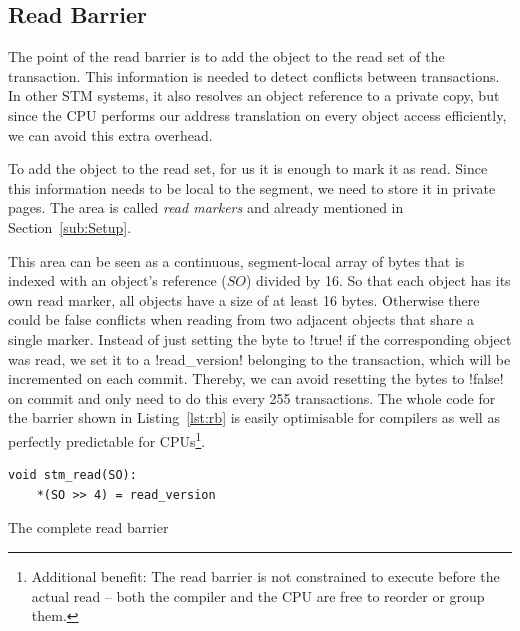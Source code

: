 \documentclass{sigplanconf}
\makeatletter
\renewcommand\lstinline[1][]{%
  \Collectverb{\@@myverb}%
}
\def\@@myverb#1{%
    \begingroup
    \fboxsep=0.2em
    \colorbox{verylightgray}{\oldlstinline|#1|}%
    \endgroup
}
\makeatother
\begin{document}
\subsection{Read Barrier}

The point of the read barrier is to add the object to the read set of
the transaction. This information is needed to detect conflicts
between transactions. In other STM systems, it also resolves an object reference to
a private copy, but since the CPU performs our address translation on
every object access efficiently, we can avoid this extra overhead.

To add the object to the read set, for us it is enough to mark it as
read. Since this information needs to be local to the segment, we need
to store it in private pages. The area is called \emph{read markers}
and already mentioned in Section~\ref{sub:Setup}.

This area can be seen as a continuous, segment-local array of bytes
that is indexed with an object's reference ($SO$) divided by 16. So
that each object has its own read marker, all objects have a size of
at least 16 bytes. Otherwise there could be false conflicts when
reading from two adjacent objects that share a single marker.
Instead of just setting the byte to \lstinline!true!  if the
corresponding object was read, we set it to a \lstinline!read_version!
belonging to the transaction, which will be incremented on each
commit.  Thereby, we can avoid resetting the bytes to
\lstinline!false!  on commit and only need to do this every 255
transactions. The whole code for the barrier shown in
Listing~\ref{lst:rb} is easily optimisable for compilers as well as
perfectly predictable for CPUs\footnote{Additional benefit: The read
barrier is not constrained to execute before the actual read -- both
the compiler and the CPU are free to reorder or group them.}.

\begin{code}[h]
\begin{lstlisting}
void stm_read(SO):
    *(SO >> 4) = read_version
\end{lstlisting}
\caption{The complete read barrier\label{lst:rb}}
\end{code}
\end{document}
